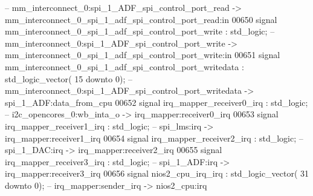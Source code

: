 \begin{DoxyCode}
{                   -- mm\_interconnect\_0:spi\_1\_ADF\_spi\_control\_port\_read ->
       mm\_interconnect\_0\_spi\_1\_adf\_spi\_control\_port\_read:in}
00650     \textcolor{keywordflow}{signal} \textcolor{vhdlchar}{mm_interconnect_0_spi_1_adf_spi_control_port_write}                          \textcolor{vhdlchar}{:} \textcolor{comment}{std\_logic};\textcolor{keyword}{        
                   -- mm\_interconnect\_0:spi\_1\_ADF\_spi\_control\_port\_write ->
       mm\_interconnect\_0\_spi\_1\_adf\_spi\_control\_port\_write:in}
00651     \textcolor{keywordflow}{signal} \textcolor{vhdlchar}{mm_interconnect_0_spi_1_adf_spi_control_port_writedata}                      \textcolor{vhdlchar}{:} \textcolor{comment}{std\_logic\_vector}\textcolor{vhdlchar}{(}\textcolor{vhdllogic}{}\textcolor{vhdllogic}{
      15} \textcolor{keywordflow}{downto} \textcolor{vhdllogic}{}\textcolor{vhdllogic}{0}\textcolor{vhdlchar}{)};\textcolor{keyword}{ -- mm\_interconnect\_0:spi\_1\_ADF\_spi\_control\_port\_writedata -> spi\_1\_ADF:data\_from\_cpu}
00652     \textcolor{keywordflow}{signal} \textcolor{vhdlchar}{irq_mapper_receiver0_irq}                                                    \textcolor{vhdlchar}{:} \textcolor{comment}{std\_logic};\textcolor{keyword}{        
                   -- i2c\_opencores\_0:wb\_inta\_o -> irq\_mapper:receiver0\_irq}
00653     \textcolor{keywordflow}{signal} \textcolor{vhdlchar}{irq_mapper_receiver1_irq}                                                    \textcolor{vhdlchar}{:} \textcolor{comment}{std\_logic};\textcolor{keyword}{        
                   -- spi\_lms:irq -> irq\_mapper:receiver1\_irq}
00654     \textcolor{keywordflow}{signal} \textcolor{vhdlchar}{irq_mapper_receiver2_irq}                                                    \textcolor{vhdlchar}{:} \textcolor{comment}{std\_logic};\textcolor{keyword}{        
                   -- spi\_1\_DAC:irq -> irq\_mapper:receiver2\_irq}
00655     \textcolor{keywordflow}{signal} \textcolor{vhdlchar}{irq_mapper_receiver3_irq}                                                    \textcolor{vhdlchar}{:} \textcolor{comment}{std\_logic};\textcolor{keyword}{        
                   -- spi\_1\_ADF:irq -> irq\_mapper:receiver3\_irq}
00656     \textcolor{keywordflow}{signal} \textcolor{vhdlchar}{nios2_cpu_irq_irq}                                                           \textcolor{vhdlchar}{:} \textcolor{comment}{std\_logic\_vector}\textcolor{vhdlchar}{(}\textcolor{vhdllogic}{}\textcolor{vhdllogic}{
      31} \textcolor{keywordflow}{downto} \textcolor{vhdllogic}{}\textcolor{vhdllogic}{0}\textcolor{vhdlchar}{)};\textcolor{keyword}{ -- irq\_mapper:sender\_irq -> nios2\_cpu:irq}

\end{DoxyCode}
